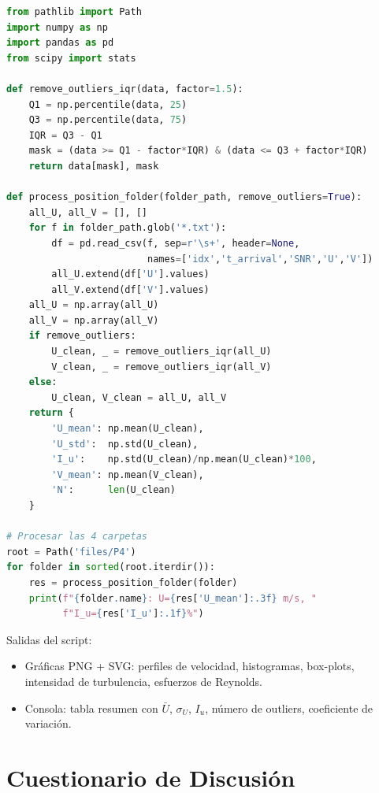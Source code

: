 \documentclass[12pt,a4paper]{article}
\begin{document}
\begin{lstlisting}[language=Python,
  caption={Flujo de procesamiento LDA (extracto del script).}]
from pathlib import Path
import numpy as np
import pandas as pd
from scipy import stats

def remove_outliers_iqr(data, factor=1.5):
    Q1 = np.percentile(data, 25)
    Q3 = np.percentile(data, 75)
    IQR = Q3 - Q1
    mask = (data >= Q1 - factor*IQR) & (data <= Q3 + factor*IQR)
    return data[mask], mask

def process_position_folder(folder_path, remove_outliers=True):
    all_U, all_V = [], []
    for f in folder_path.glob('*.txt'):
        df = pd.read_csv(f, sep=r'\s+', header=None,
                         names=['idx','t_arrival','SNR','U','V'])
        all_U.extend(df['U'].values)
        all_V.extend(df['V'].values)
    all_U = np.array(all_U)
    all_V = np.array(all_V)
    if remove_outliers:
        U_clean, _ = remove_outliers_iqr(all_U)
        V_clean, _ = remove_outliers_iqr(all_V)
    else:
        U_clean, V_clean = all_U, all_V
    return {
        'U_mean': np.mean(U_clean),
        'U_std':  np.std(U_clean),
        'I_u':    np.std(U_clean)/np.mean(U_clean)*100,
        'V_mean': np.mean(V_clean),
        'N':      len(U_clean)
    }

# Procesar las 4 carpetas
root = Path('files/P4')
for folder in sorted(root.iterdir()):
    res = process_position_folder(folder)
    print(f"{folder.name}: U={res['U_mean']:.3f} m/s, "
          f"I_u={res['I_u']:.1f}%")
\end{lstlisting}

Salidas del script:
\begin{itemize}
	\item Gráficas PNG + SVG: perfiles de velocidad, histogramas, box-plots,
	      intensidad de turbulencia, esfuerzos de Reynolds.
	\item Consola: tabla resumen con $\bar{U}$, $\sigma_U$, $I_u$,
	      número de outliers, coeficiente de variación.
\end{itemize}

\section{Cuestionario de Discusión}
\label{sec:cuestionario}
\end{document}
